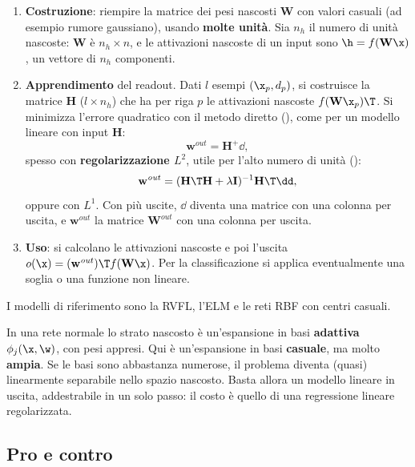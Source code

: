 \begin{algoritmo}
\begin{enumerate}
  \item \textbf{Costruzione}: riempire la matrice dei pesi nascosti $\mathbf W$ con valori casuali (ad esempio rumore
        gaussiano), usando \textbf{molte unità}. Sia $n_h$ il numero di unità nascoste: $\mathbf W$ è $n_h\times n$, e
        le attivazioni nascoste di un input sono $\h = f(\mathbf W\x)$, un vettore di $n_h$ componenti.
  \item \textbf{Apprendimento} del readout. Dati $l$ esempi $(\x_p,d_p)$, si costruisce la matrice $\mathbf H$
        ($l\times n_h$) che ha per riga $p$ le attivazioni nascoste $f(\mathbf W\x_p)\T$. Si minimizza l'errore
        quadratico con il metodo diretto (), come per un modello lineare con input
        $\mathbf H$:
        \[
        \mathbf w^{\mathit{out}} = \mathbf H^+\dd ,
        \]
        spesso con \textbf{regolarizzazione $L^2$}, utile per l'alto numero di unità ():
        \[
        \mathbf w^{\mathit{out}} = (\mathbf H\T\mathbf H + \lambda\mathbf I)^{-1}\mathbf H\T\dd ,
        \]
        oppure con $L^1$. Con più uscite, $\dd$ diventa una matrice con una colonna per uscita, e $\mathbf w^{\mathit{out}}$
        la matrice $\mathbf W^{\mathit{out}}$ con una colonna per uscita.
  \item \textbf{Uso}: si calcolano le attivazioni nascoste e poi l'uscita
        $o(\x) = (\mathbf w^{\mathit{out}})\T f(\mathbf W\x)$. Per la classificazione si applica eventualmente una
        soglia o una funzione non lineare.
\end{enumerate}
\end{algoritmo}

I modelli di riferimento sono la RVFL, l'ELM e le reti RBF con centri casuali.

\begin{idea}
In una rete normale lo strato nascosto è un'espansione in basi \textbf{adattiva} $\phi_j(\x,\w)$, con pesi appresi.
Qui è un'espansione in basi \textbf{casuale}, ma molto \textbf{ampia}. Se le basi sono abbastanza numerose, il
problema diventa (quasi) linearmente separabile nello spazio nascosto. Basta allora un modello lineare in uscita,
addestrabile in un solo passo: il costo è quello di una regressione lineare regolarizzata.
\end{idea}

\subsection{Pro e contro}

